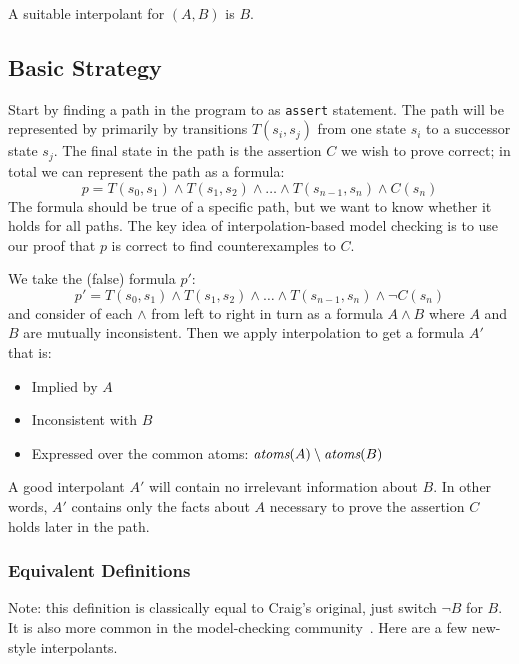 \documentclass{article}
\begin{document}
A suitable interpolant for $(A, B)$ is $B$.


\subsection{Basic Strategy}
Start by finding a path in the program to as {\tt assert} statement.
The path will be represented by primarily by transitions $T(s_i, s_j)$ from
 one state $s_i$ to a successor state $s_j$.
The final state in the path is the assertion $C$ we wish to prove correct;
 in total we can represent the path as a formula:
 $$p = T(s_0, s_1) \wedge T(s_1, s_2) \wedge \ldots \wedge T(s_{n-1}, s_n) \wedge C(s_n)$$
The formula should be true of a specific path, but we want to know whether it
 holds for all paths.
The key idea of interpolation-based model checking is to use our proof that $p$
 is correct to find counterexamples to $C$.

We take the (false) formula $p'$:
 $$p' = T(s_0, s_1) \wedge T(s_1, s_2) \wedge \ldots \wedge T(s_{n-1}, s_n) \wedge \neg C(s_n)$$
 and consider of each $\wedge$ from left to right in turn as a formula $A \wedge B$
 where $A$ and $B$ are mutually inconsistent.
Then we apply interpolation to get a formula $A'$ that is:
\begin{itemize}
\item Implied by $A$
\item Inconsistent with $B$
\item Expressed over the common atoms: $\emph{atoms}(A) \setminus \emph{atoms}(B)$
\end{itemize}

A good interpolant $A'$ will contain no irrelevant information about $B$.
In other words, $A'$ contains only the facts about $A$ necessary to prove the
 assertion $C$ holds later in the path.


\subsubsection{Equivalent Definitions}
Note: this definition is classically equal to Craig's original, just switch $\neg B$ for $B$.
It is also more common in the model-checking community~\cite{m-tacas-2005}.
Here are a few new-style interpolants.
\end{document}
